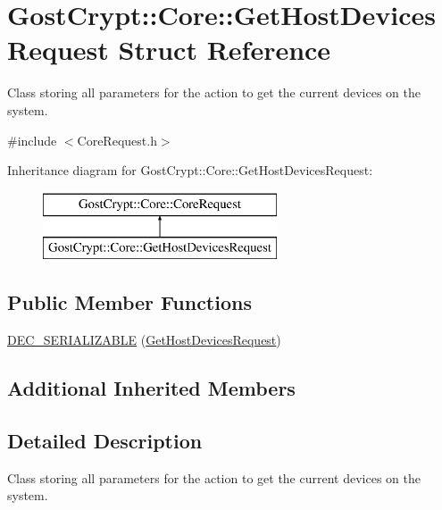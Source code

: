 \hypertarget{struct_gost_crypt_1_1_core_1_1_get_host_devices_request}{}\section{Gost\+Crypt\+:\+:Core\+:\+:Get\+Host\+Devices\+Request Struct Reference}
\label{struct_gost_crypt_1_1_core_1_1_get_host_devices_request}


Class storing all parameters for the action to get the current devices on the system.  




{\ttfamily \#include $<$Core\+Request.\+h$>$}

Inheritance diagram for Gost\+Crypt\+:\+:Core\+:\+:Get\+Host\+Devices\+Request\+:\begin{figure}[H]
\begin{center}
\leavevmode
\includegraphics[height=2.000000cm]{struct_gost_crypt_1_1_core_1_1_get_host_devices_request}
\end{center}
\end{figure}
\subsection*{Public Member Functions}
\begin{DoxyCompactItemize}
\item 
\hyperlink{struct_gost_crypt_1_1_core_1_1_get_host_devices_request_a64b6f5579ca7a7784fc246109d581073}{D\+E\+C\+\_\+\+S\+E\+R\+I\+A\+L\+I\+Z\+A\+B\+LE} (\hyperlink{struct_gost_crypt_1_1_core_1_1_get_host_devices_request}{Get\+Host\+Devices\+Request})
\end{DoxyCompactItemize}
\subsection*{Additional Inherited Members}


\subsection{Detailed Description}
Class storing all parameters for the action to get the current devices on the system. 

